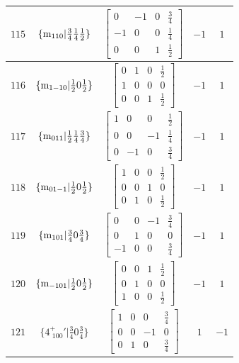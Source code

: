 \documentclass[fleqn,8pt]{jsarticle}
\begin{document}
\begin{longtable}{ccccc}
$ 115 $ & $ \{{\rm m}_{110}|\frac{3}{4} \frac{1}{4} \frac{1}{2}\} $ & $ \begin{bmatrix} 0 & -1 & 0 & \frac{3}{4} \\ -1 & 0 & 0 & \frac{1}{4} \\ 0 & 0 & 1 & \frac{1}{2} \end{bmatrix} $ & $ -1 $ & $ 1 $ \\ \hline
$ 116 $ & $ \{{\rm m}_{1-10}|\frac{1}{2} 0 \frac{1}{2}\} $ & $ \begin{bmatrix} 0 & 1 & 0 & \frac{1}{2} \\ 1 & 0 & 0 & 0 \\ 0 & 0 & 1 & \frac{1}{2} \end{bmatrix} $ & $ -1 $ & $ 1 $ \\ \hline
$ 117 $ & $ \{{\rm m}_{011}|\frac{1}{2} \frac{1}{4} \frac{3}{4}\} $ & $ \begin{bmatrix} 1 & 0 & 0 & \frac{1}{2} \\ 0 & 0 & -1 & \frac{1}{4} \\ 0 & -1 & 0 & \frac{3}{4} \end{bmatrix} $ & $ -1 $ & $ 1 $ \\ \hline
$ 118 $ & $ \{{\rm m}_{01-1}|\frac{1}{2} 0 \frac{1}{2}\} $ & $ \begin{bmatrix} 1 & 0 & 0 & \frac{1}{2} \\ 0 & 0 & 1 & 0 \\ 0 & 1 & 0 & \frac{1}{2} \end{bmatrix} $ & $ -1 $ & $ 1 $ \\ \hline
$ 119 $ & $ \{{\rm m}_{101}|\frac{3}{4} 0 \frac{3}{4}\} $ & $ \begin{bmatrix} 0 & 0 & -1 & \frac{3}{4} \\ 0 & 1 & 0 & 0 \\ -1 & 0 & 0 & \frac{3}{4} \end{bmatrix} $ & $ -1 $ & $ 1 $ \\ \hline
$ 120 $ & $ \{{\rm m}_{-101}|\frac{1}{2} 0 \frac{1}{2}\} $ & $ \begin{bmatrix} 0 & 0 & 1 & \frac{1}{2} \\ 0 & 1 & 0 & 0 \\ 1 & 0 & 0 & \frac{1}{2} \end{bmatrix} $ & $ -1 $ & $ 1 $ \\ \hline
$ 121 $ & $ \{4^{+}_{\,\,100}{}'|\frac{3}{4} 0 \frac{3}{4}\} $ & $ \begin{bmatrix} 1 & 0 & 0 & \frac{3}{4} \\ 0 & 0 & -1 & 0 \\ 0 & 1 & 0 & \frac{3}{4} \end{bmatrix} $ & $ 1 $ & $ -1 $ \\ \hline

\end{longtable}
\end{document}
